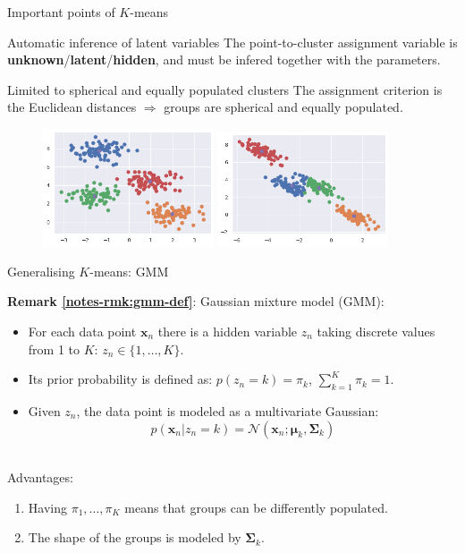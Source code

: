 \documentclass{beamer}
\newcommand{\bs}[1]{\boldsymbol{#1}}
\newcommand{\remark}[2]{\noindent\colorbox{red!10}{\parbox{0.995\textwidth}{\textbf{Remark \ref{notes-rmk:#1}}: #2}}\\}
\begin{document}
\begin{frame}{Important points of $K$-means}
 \begin{block}{Automatic inference of latent variables}
  The point-to-cluster assignment variable is \textbf{unknown}/\textbf{latent}/\textbf{hidden}, and must be infered together with the parameters.
 \end{block}

 \begin{block}{Limited to spherical and equally populated clusters}
  The assignment criterion is the Euclidean distances $\Rightarrow$ groups are spherical and equally populated.
 \end{block}
 
 \begin{figure}
  \centering
       \includegraphics[width=0.45\textwidth]{fig/clustering_done}
     \hspace{5mm}
     \includegraphics[width=0.45\textwidth]{fig/clustering_fail}
 \end{figure}
\end{frame}

\begin{frame}{Generalising $K$-means: GMM}
\remark{gmm-def}{Gaussian mixture model (GMM):
\begin{itemize}
 \item For each data point $\bs{x}_n$ there is a hidden variable $z_n$ taking discrete values from 1 to $K$: $z_n\in\{1,\ldots,K\}$.\pause
 \item Its prior probability is defined as: $p(z_n=k)=\pi_k$, $\sum_{k=1}^K \pi_k = 1$.\pause
 \item Given $z_n$, the data point is modeled as a multivariate Gaussian:\vspace{-2mm}
 \[p(\bs{x}_n|z_n=k) = \mathcal{N}(\bs{x}_n;\bs{\mu}_k,\bs{\Sigma}_k) \]\vspace{-4mm}
\end{itemize}
}\vspace{3mm}
Advantages:
 \begin{enumerate}
  \item Having $\pi_1,\ldots,\pi_K$ means that groups can be differently populated.
  \item The shape of the groups is modeled by $\bs{\Sigma}_k$.
 \end{enumerate}
\end{frame}
\end{document}
